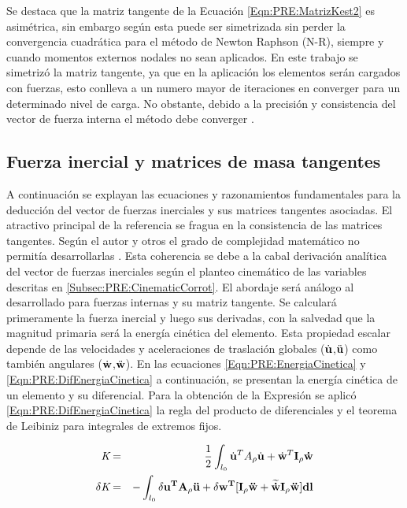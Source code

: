 Se destaca que la matriz tangente de la Ecuación  \eqref{Eqn:PRE:MatrizKest2} es asimétrica, sin embargo según \cite{Rankin1986} esta puede ser simetrizada sin perder la convergencia cuadrática 
para el método de  Newton Raphson (N-R), siempre y cuando momentos externos nodales no sean aplicados. En este trabajo se simetrizó la matriz tangente, ya que en la aplicación los elementos serán cargados con fuerzas, esto conlleva a un numero mayor de iteraciones en converger para un determinado nivel de carga. No obstante, debido a la precisión y consistencia del vector de fuerza interna el método debe converger \cite{Rankin1986}. 

\subsection{Fuerza inercial y matrices de masa tangentes}\label{Sec:PRE:Inercial}

A continuación se explayan las ecuaciones y razonamientos fundamentales para la deducción del vector de fuerzas inerciales y sus matrices tangentes asociadas. El atractivo principal de la referencia \citet{Le2014} se fragua en la consistencia de las matrices tangentes. Según el autor y otros el grado de complejidad matemático no permitía desarrollarlas \cite{Crisfield}. Esta coherencia se debe a la cabal derivación analítica del vector de fuerzas inerciales según el planteo cinemático de las variables descritas en \ref{Subsec:PRE:CinematicCorrot}. El abordaje será análogo al desarrollado para fuerzas internas y su matriz tangente. Se calculará primeramente la fuerza inercial y luego sus derivadas, con la salvedad que la magnitud primaria será la energía cinética del elemento. Esta propiedad escalar depende de las velocidades y aceleraciones de traslación globales ($\dot{\bf{u}}$,$\ddot{\bf{u}}$) como también angulares ($\dot{\bf{w}}$,$\ddot{\bf{w}}$). En las ecuaciones \eqref{Eqn:PRE:EnergiaCinetica} y \eqref{Eqn:PRE:DifEnergiaCinetica} a continuación, se presentan la energía cinética de un elemento y su diferencial. Para la obtención de la Expresión se aplicó \eqref{Eqn:PRE:DifEnergiaCinetica} la regla del producto de diferenciales y el teorema de Leibiniz para integrales de extremos fijos. 

\begin{eqnarray}
		\textit{K}&=&\frac{1}{2}\int_{l_0} \dot{\bf{u}}^T A_{\rho} \dot{\bf{u}} +
		\dot{\bf{w}}^T \bf{I_{\rho}}\dot{\bf{w}}
		\label{Eqn:PRE:EnergiaCinetica}\\
		\delta\textit{K}&=&-\int_{l_0} \delta \bf{u}^T A_{\rho} \ddot{\bf{u}} +\delta
		\bf{w}^T[\bf{I_{\rho}}\ddot{\bf{w}}+\widetilde{\dot{\bf{w}}}\bf{I_{\rho}}\ddot{\bf{w}}]
		dl	
		\label{Eqn:PRE:DifEnergiaCinetica}
\end{eqnarray}


